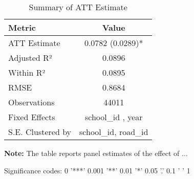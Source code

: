 \begin{table}[H]
\centering
\caption{Summary of ATT Estimate}
\label{tab:SA_inse_50p}
 \begin{center}
 \begin{tabular}{lc}
 \toprule
Metric & Value \\
\midrule
ATT Estimate & 0.0782 (0.0289)* \\
\hline 
 Adjusted R² & 0.0896 \\
Within R² & 0.0895 \\
RMSE & 0.8684 \\
Observations & 44011 \\
\hline 
 Fixed Effects & school_id ,  year \\
S.E. Clustered by & school_id, road_id \\
\bottomrule
\end{tabular}
 \end{center}\begin{tablenotes}
\small
\item \textbf{Note:} The table reports panel estimates of the effect of ...
\item Significance codes: 0 '***' 0.001 '**' 0.01 '*' 0.05 '.' 0.1 ' ' 1
\end{tablenotes}
\end{table}